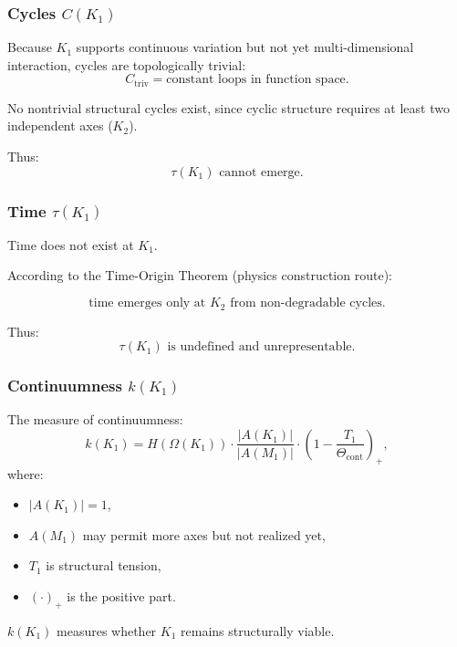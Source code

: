 \subsubsection{Cycles \texorpdfstring{$C(K_1)$}{C(K_1)}}

Because $K_1$ supports continuous variation but not yet multi-dimensional
interaction, cycles are topologically trivial:
\[
C_{\mathrm{triv}} = \text{constant loops in function space}.
\]

No nontrivial structural cycles exist, since cyclic structure requires
at least two independent axes ($K_2$).

Thus:
\[
\tau(K_1) \text{ cannot emerge.}
\]

\subsubsection{Time \texorpdfstring{$\tau(K_1)$}{\tau(K_1)}}

Time does not exist at $K_1$.

According to the Time-Origin Theorem (physics construction route):

\[
\text{time emerges only at } K_2 \text{ from non-degradable cycles}.
\]

Thus:
\[
\tau(K_1) \text{ is undefined and unrepresentable.}
\]

\subsubsection{Continuumness \texorpdfstring{$k(K_1)$}{k(K_1)}}

The measure of continuumness:
\[
k(K_1) =
H(\Omega(K_1)) \cdot
\frac{|A(K_1)|}{|A(M_1)|} \cdot
(1 - \frac{T_1}{\Theta_{\mathrm{cont}}})_+,
\]
where:
\begin{itemize}
    \item $|A(K_1)| = 1$,
    \item $A(M_1)$ may permit more axes but not realized yet,
    \item $T_1$ is structural tension,
    \item $(\cdot)_+$ is the positive part.
\end{itemize}

$k(K_1)$ measures whether $K_1$ remains structurally viable.

